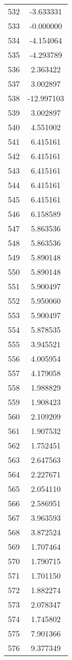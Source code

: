 \documentclass[12pt]{article}
\begin{document}
\begin{longtable}{@{}cc@{}}
532 & -3.633331 \\
533 & -0.000000 \\
534 & -4.154064 \\
535 & -4.293789 \\
536 & 2.363422 \\
537 & 3.002897 \\
538 & -12.997103 \\
539 & 3.002897 \\
540 & 4.551002 \\
541 & 6.415161 \\
542 & 6.415161 \\
543 & 6.415161 \\
544 & 6.415161 \\
545 & 6.415161 \\
546 & 6.158589 \\
547 & 5.863536 \\
548 & 5.863536 \\
549 & 5.890148 \\
550 & 5.890148 \\
551 & 5.900497 \\
552 & 5.950060 \\
553 & 5.900497 \\
554 & 5.878535 \\
555 & 3.945521 \\
556 & 4.005954 \\
557 & 4.179058 \\
558 & 1.988829 \\
559 & 1.908423 \\
560 & 2.109209 \\
561 & 1.907532 \\
562 & 1.752451 \\
563 & 2.647563 \\
564 & 2.227671 \\
565 & 2.054110 \\
566 & 2.586951 \\
567 & 3.963593 \\
568 & 3.872524 \\
569 & 1.707464 \\
570 & 1.790715 \\
571 & 1.701150 \\
572 & 1.882274 \\
573 & 2.078347 \\
574 & 1.745802 \\
575 & 7.901366 \\
576 & 9.377349 \\

\end{longtable}
\end{document}
